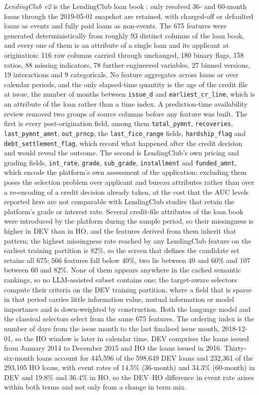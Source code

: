 \documentclass[final,5p,twocolumn]{elsarticle}
\begin{document}
\emph{LendingClub v2} is the LendingClub loan book \cite{lendingclub_kaggle}: only resolved 36- and 60-month loans through the 2019-05-01 snapshot are retained, with charged-off or defaulted loans as events and fully paid loans as non-events. The 675 features were generated deterministically from roughly 93 distinct columns of the loan book, and every one of them is an attribute of a single loan and its applicant at origination: 116 raw columns carried through unchanged, 180 binary flags, 158 ratios, 88 missing indicators, 78 further engineered variables, 27 binned versions, 19 interactions and 9 categoricals. No feature aggregates across loans or over calendar periods, and the only elapsed-time quantity is the age of the credit file at issue, the number of months between \texttt{issue\_d} and \texttt{earliest\_cr\_line}, which is an attribute of the loan rather than a time index. A prediction-time availability review removed two groups of source columns before any feature was built. The first is every post-origination field, among them \texttt{total\_pymnt}, \texttt{recoveries}, \texttt{last\_pymnt\_amnt}, \texttt{out\_prncp}, the \texttt{last\_fico\_range} fields, \texttt{hardship\_flag} and \texttt{debt\_settlement\_flag}, which record what happened after the credit decision and would reveal the outcome. The second is LendingClub's own pricing and grading fields, \texttt{int\_rate}, \texttt{grade}, \texttt{sub\_grade}, \texttt{installment} and \texttt{funded\_amnt}, which encode the platform's own assessment of the application: excluding them poses the selection problem over applicant and bureau attributes rather than over a re-encoding of a credit decision already taken, at the cost that the AUC levels reported here are not comparable with LendingClub studies that retain the platform's grade or interest rate. Several credit-file attributes of the loan book were introduced by the platform during the sample period, so their missingness is higher in DEV than in HO, and the features derived from them inherit that pattern; the highest missingness rate reached by any LendingClub feature on the earliest training partition is 82\%, so the screen that defines the candidate set retains all 675; 566 features fall below 40\%, two lie between 40 and 60\% and 107 between 60 and 82\%. None of them appears anywhere in the cached semantic rankings, so no LLM-assisted subset contains one; the target-aware selectors compute their criteria on the DEV training partition, where a field that is sparse in that period carries little information value, mutual information or model importance and is down-weighted by construction. Both the language model and the classical selectors select from the same 675 features. The ordering index is the number of days from the issue month to the last finalised issue month, 2018-12-01, so the HO window is later in calendar time. DEV comprises the loans issued from January 2014 to December 2015 and HO the loans issued in 2016. Thirty-six-month loans account for 445,596 of the 598,649 DEV loans and 232,361 of the 293,105 HO loans, with event rates of 14.5\% (36-month) and 34.3\% (60-month) in DEV and 19.8\% and 36.4\% in HO, so the DEV--HO difference in event rate arises within both terms and not only from a change in term mix.
\end{document}
